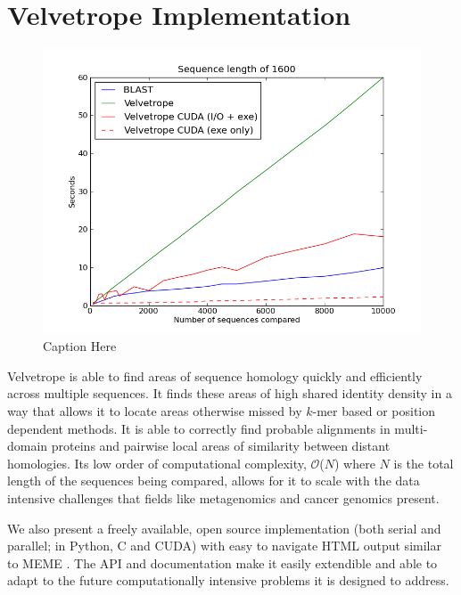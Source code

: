 \documentclass[phd,tocprelim]{cornell}
\begin{document}


\chapter{Velvetrope Implementation} %
\label{cha:Velvetrope Implementation}

\begin{figure}[htp]%
 \centerline{\includegraphics[width=\textwidth]{figures/velvetrope/timersSC.png}}
 \caption[Velvetrope timings]{Caption Here}
 	\label{fig:vr06}
 \end{figure}

Velvetrope is able to find areas of sequence homology quickly and efficiently across multiple sequences. It finds these areas of high shared identity density in a way that allows it to locate areas otherwise missed by $k$-mer based or position dependent methods. It is able to correctly find probable alignments in multi-domain proteins and pairwise local areas of similarity between distant homologies. Its low order of computational complexity, $\mathcal O$($N$) where $N$ is the total length of the sequences
being compared, allows for it to scale with the data intensive challenges that fields like metagenomics and cancer genomics present.

We also present a freely available, open source implementation (both serial and parallel; in Python, C and CUDA) with easy to navigate HTML output similar to MEME \cite{MEME}. The API and documentation make it easily extendible and able to adapt to the future computationally intensive problems it is designed to address.
\end{document}
